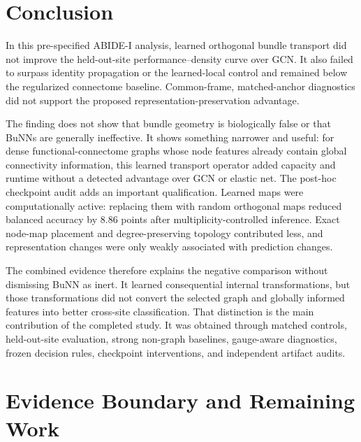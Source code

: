 \documentclass[11pt,a4paper]{article}
\begin{document}
\section{Conclusion}

In this pre-specified ABIDE-I analysis, learned orthogonal bundle transport did
not improve the held-out-site performance--density curve over GCN. It also
failed to surpass identity propagation or the learned-local control and
remained below the regularized connectome baseline. Common-frame,
matched-anchor diagnostics did not support the proposed
representation-preservation advantage.

The finding does not show that bundle geometry is biologically false or that
BuNNs are generally ineffective. It shows something narrower and useful:
for dense functional-connectome graphs whose node features already contain
global connectivity information, this learned transport operator added
capacity and runtime without a detected advantage over GCN or elastic net.
The post-hoc checkpoint audit adds an important qualification. Learned maps
were computationally active: replacing them with random orthogonal maps
reduced balanced accuracy by 8.86 points after multiplicity-controlled
inference. Exact node-map placement and degree-preserving topology contributed
less, and representation changes were only weakly associated with prediction
changes.

The combined evidence therefore explains the negative comparison without
dismissing BuNN as inert. It learned consequential internal transformations,
but those transformations did not convert the selected graph and globally
informed features into better cross-site classification. That distinction is
the main contribution of the completed study. It was obtained through matched
controls, held-out-site evaluation, strong non-graph baselines, gauge-aware
diagnostics, frozen decision rules, checkpoint interventions, and independent
artifact audits.

\clearpage
\section*{Evidence Boundary and Remaining Work}
\end{document}
